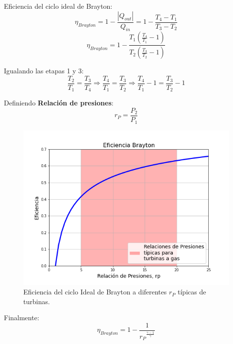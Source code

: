             \begin{multicols}{2}
            Eficiencia del ciclo ideal de Brayton:
            \[\eta_{Brayton}=1-\frac{|Q_{out}|}{Q_{in}}=1-\frac{T_{4}-T_{1}}{T_{3}-T_{2}}\]
            \[\eta_{Brayton}=1-\frac{T_{1}\left ( \frac{T_{4}}{T_{1}} - 1 \right )}{T_{2}\left ( \frac{T_{3}}{T_{2}} - 1 \right )}\]
            
            Igualando las etapas 1 y 3:
            \[\frac{T_{2}}{T_{1}}=\frac{T_{3}}{T_{4}} \Rightarrow \frac{T_{4}}{T_{1}}=\frac{T_{3}}{T_{2}} \Rightarrow \frac{T_{4}}{T_{1}} - 1=\frac{T_{3}}{T_{2}} - 1\]
            
            Definiendo \textbf{Relación de presiones}:
            \begin{equation}
            \label{def_rel_pres}
                r_{P} = \frac{P_{2}}{P_{1}}    
            \end{equation}
            
            \begin{figure}
                \includegraphics[width=\textwidth]{img/graficos/ef_brayton_turbinas.png}
                \caption[Eficiencia ciclo Ideal de Brayton]{Eficiencia del ciclo Ideal de Brayton a diferentes \(r_{P}\) típicas de turbinas.}
                \label{fig:ef_brayton}
            \end{figure}
            \end{multicols}
            
            Finalmente:
            \begin{equation}
            \label{ef_brayton}
                \eta_{Brayton}=1-\frac{1}{{r_{P}}^{\frac{\gamma - 1}{\gamma}}}
            \end{equation}
            
